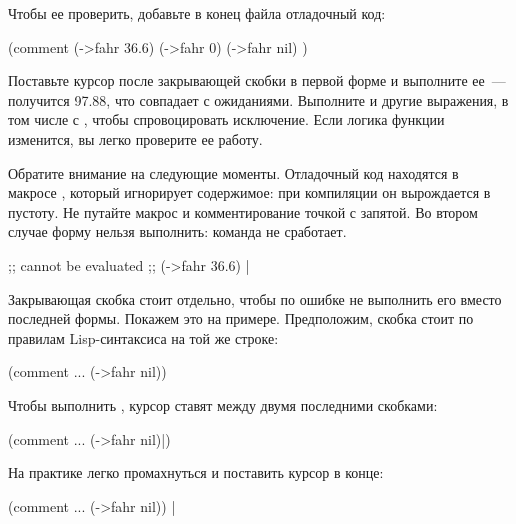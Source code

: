 Чтобы ее проверить, добавьте в конец файла отладочный код:

\begin{english}
  \begin{clojure}
(comment
  (->fahr 36.6)
  (->fahr 0)
  (->fahr nil)
  )
  \end{clojure}
\end{english}

Поставьте курсор после закрывающей скобки в первой форме и выполните ее~--- получится 97.88, что совпадает с ожиданиями. Выполните и другие выражения, в том числе с , чтобы спровоцировать исключение. Если логика функции изменится, вы легко проверите ее работу.

Обратите внимание на следующие моменты. Отладочный код находятся в макросе , который игнорирует содержимое: при компиляции он вырождается в пустоту. Не путайте макрос  и комментирование точкой с запятой. Во втором случае форму нельзя выполнить: команда  не сработает.

\begin{english}
  \begin{clojure}
;; cannot be evaluated
;; (->fahr 36.6) |
  \end{clojure}
\end{english}

Закрывающая скобка  стоит отдельно, чтобы по ошибке не выполнить его вместо последней формы. Покажем это на примере. Предположим, скобка стоит по правилам Lisp-синтаксиса на той же строке:

\begin{english}
  \begin{clojure}
(comment
  ...
  (->fahr nil))
  \end{clojure}
\end{english}

Чтобы выполнить , курсор ставят между двумя последними скобками:

\begin{english}
  \begin{clojure}
(comment
  ...
  (->fahr nil)|)
  \end{clojure}
\end{english}

На практике легко промахнуться и поставить курсор в конце:

\begin{english}
  \begin{clojure}
(comment
  ...
  (->fahr nil)) |
  \end{clojure}
\end{english}

